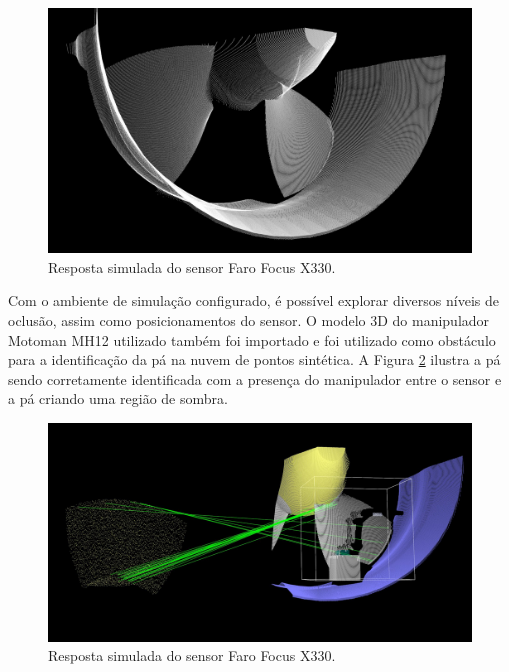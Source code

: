 \begin{figure}[H]
	\centering
	\includegraphics[width=0.9\columnwidth]{figs/calibracao/blensor_faro}
	\caption{Resposta simulada do sensor Faro Focus X330.}
    \label{fig::blensor_faro}
\end{figure}	


Com o ambiente de simulação configurado, é possível explorar diversos níveis de
oclusão, assim como posicionamentos do sensor. O modelo 3D do manipulador
Motoman MH12 utilizado também foi importado e foi utilizado como obstáculo para
a identificação da pá na nuvem de pontos sintética. A Figura \ref{fig::sim_mh12}
ilustra a pá sendo corretamente identificada com a presença do manipulador entre
o sensor e a pá criando uma região de sombra.

\begin{figure}[H]
	\centering
	\includegraphics[width=0.9\columnwidth]{figs/calibracao/sim_mh12}
	\caption{Resposta simulada do sensor Faro Focus X330.}
    \label{fig::sim_mh12}
\end{figure}	
